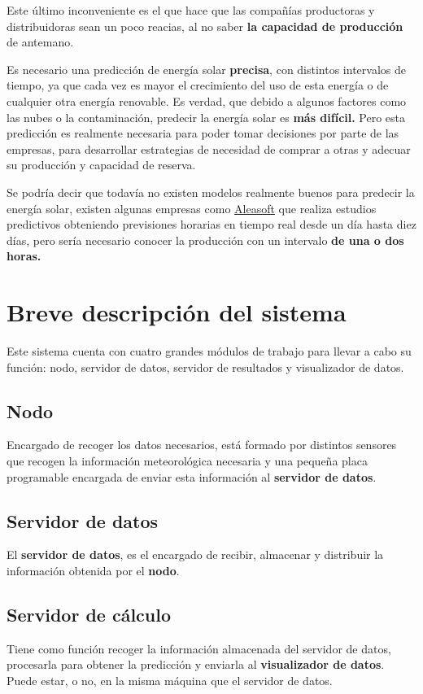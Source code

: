 Este último inconveniente es el que hace que las compañías productoras y distribuidoras sean un poco reacias, al no saber \textbf{la capacidad de producción} de antemano.

Es necesario una predicción de energía solar \textbf{precisa}, con distintos intervalos de tiempo, ya que cada vez es mayor el crecimiento del uso de esta energía o de cualquier otra energía renovable. 
Es verdad, que debido a algunos factores como las nubes o la contaminación, predecir la energía solar es \textbf{más difícil.}
Pero esta predicción es realmente necesaria para poder tomar decisiones por parte de las empresas, para desarrollar estrategias de necesidad de comprar a otras y adecuar su producción y capacidad de reserva.

Se podría decir que todavía no existen modelos realmente buenos para predecir la energía solar, existen algunas empresas como  \href{https://aleasoft.com/es/}{Aleasoft} que realiza estudios predictivos obteniendo previsiones horarias en tiempo real desde un día hasta diez días, pero sería necesario conocer la producción con un intervalo \textbf{de una o dos horas.}

\section{Breve descripción del sistema}
\label{makereference1.2}

Este sistema cuenta con cuatro grandes módulos de trabajo para llevar a cabo su función: nodo, servidor de datos, servidor de resultados y visualizador de datos.

\subsection{Nodo}
\label{makereference1.2.1}
Encargado de recoger los datos necesarios, está formado por distintos sensores que recogen la información meteorológica necesaria y una pequeña placa programable encargada de enviar esta información al \textbf{servidor de datos}.

\subsection{Servidor de datos}
\label{makereference1.2.2}
El \textbf{servidor de datos}, es el encargado de recibir, almacenar y distribuir la información obtenida por el \textbf{nodo}.

\subsection{Servidor de cálculo}
\label{makereference1.2.3}
Tiene como función recoger la información almacenada del servidor de datos, procesarla para obtener la predicción y enviarla al \textbf{visualizador de datos}. Puede estar, o no, en la misma máquina que el servidor de datos.

